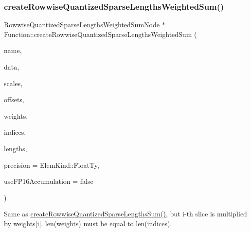 \subsubsection{\texorpdfstring{create\+Rowwise\+Quantized\+Sparse\+Lengths\+Weighted\+Sum()}{createRowwiseQuantizedSparseLengthsWeightedSum()}\hspace{0.1cm}{\footnotesize\ttfamily [1/2]}}
{\footnotesize\ttfamily \hyperlink{classglow_1_1_rowwise_quantized_sparse_lengths_weighted_sum_node}{Rowwise\+Quantized\+Sparse\+Lengths\+Weighted\+Sum\+Node} $\ast$ Function\+::create\+Rowwise\+Quantized\+Sparse\+Lengths\+Weighted\+Sum (\begin{DoxyParamCaption}\item[{llvm\+::\+String\+Ref}]{name,  }\item[{\hyperlink{classglow_1_1_constant}{Constant} $\ast$}]{data,  }\item[{\hyperlink{classglow_1_1_constant}{Constant} $\ast$}]{scales,  }\item[{\hyperlink{classglow_1_1_constant}{Constant} $\ast$}]{offsets,  }\item[{\hyperlink{structglow_1_1_node_value}{Node\+Value}}]{weights,  }\item[{\hyperlink{structglow_1_1_node_value}{Node\+Value}}]{indices,  }\item[{\hyperlink{structglow_1_1_node_value}{Node\+Value}}]{lengths,  }\item[{\hyperlink{namespaceglow_ab92e14a94329daf4083db670e95fbcdf}{Elem\+Kind}}]{precision = {\ttfamily ElemKind\+:\+:FloatTy},  }\item[{bool}]{use\+F\+P16\+Accumulation = {\ttfamily false} }\end{DoxyParamCaption})}

Same as \hyperlink{classglow_1_1_function_a336683b0ec8e06e084caec12f60142fd}{create\+Rowwise\+Quantized\+Sparse\+Lengths\+Sum()}, but i-\/th slice is multiplied by weights\mbox{[}i\mbox{]}. len(weights) must be equal to len(indices). \mbox{\label{classglow_1_1_function_aae39e625ab8f247f03f7283dd7d0dd80}} 
